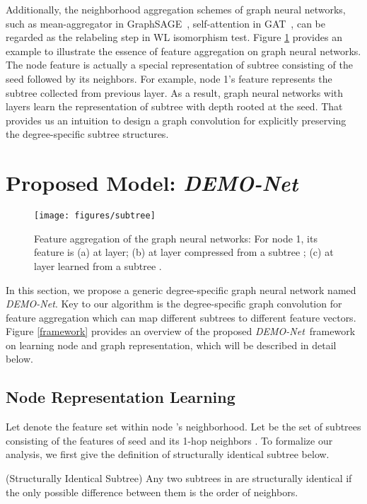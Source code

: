 \documentclass[sigconf]{acmart}
\newcommand{\demonet}{{\emph {DEMO-Net}}}
\begin{document}
Additionally, the neighborhood aggregation schemes of graph neural networks, such as mean-aggregator in GraphSAGE~\cite{hamilton2017inductive}, self-attention in GAT~\cite{velickovic2017graph}, can be regarded as the relabeling step in WL isomorphism test. Figure \ref{subtree} provides an example to illustrate the essence of feature aggregation on graph neural networks. The node feature is actually a special representation of subtree consisting of the seed followed by its neighbors. For example, node 1's feature  represents the subtree  collected from previous layer. As a result, graph neural networks with  layers learn the representation of subtree with depth  rooted at the seed. That provides us an intuition to design a graph convolution for explicitly preserving the degree-specific subtree structures.

\section{Proposed Model: \demonet}

\begin{figure}
\centering
\texttt{[image: figures/subtree]}
\caption{Feature aggregation of the graph neural networks: For node 1, its feature is (a)  at  layer; (b)  at  layer compressed from a subtree ; (c)  at  layer learned from a subtree .}
\label{subtree}
\vspace{-3mm}
\end{figure}

In this section, we propose a generic degree-specific graph neural network named \demonet. Key to our algorithm is the degree-specific graph convolution for feature aggregation which can map different subtrees to different feature vectors. Figure \ref{framework} provides an overview of the proposed \demonet\ framework on learning node and graph representation, which will be described in detail below.

\subsection{Node Representation Learning}
Let  denote the feature set  within node 's neighborhood.
Let  be the set of subtrees consisting of the features of seed  and its 1-hop neighbors . To formalize our analysis, we first give the definition of structurally identical subtree below.
\begin{definition}(Structurally Identical Subtree)
Any two subtrees in  are structurally identical if the only possible difference between them is the order of neighbors.
\end{definition}
\end{document}

